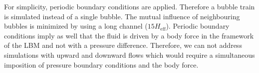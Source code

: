 \documentclass[preprint,12pt]{elsarticle}
\begin{document}
For simplicity, periodic boundary conditions are applied. Therefore  a bubble
train is simulated
instead of a single bubble.  The mutual influence of neighbouring bubbles is minimized
by using a long
channel ($15 H_{\mathrm{eff}}$). Periodic boundary conditions imply as well that the fluid is driven
by a
body force in the framework of the LBM and not with a pressure difference. Therefore, we can not
address simulations with upward and downward flows \cite{cerro-bubble-train} which would require a
simultaneous imposition of pressure boundary conditions and the body force. 
\end{document}
